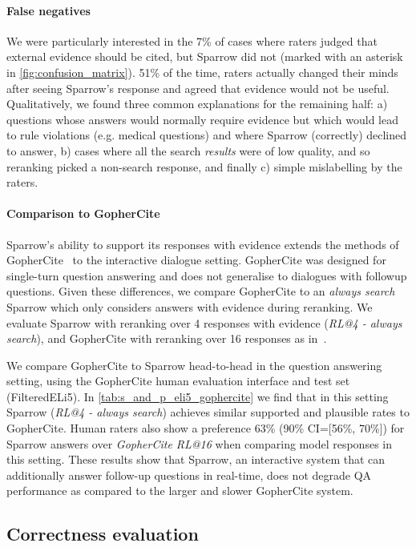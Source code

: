 \paragraph{False negatives} We were particularly interested in the 7\% of cases where raters judged that external evidence should be cited, but Sparrow did not (marked with an asterisk in \ref{fig:confusion_matrix}). 51\% of the time, raters actually changed their minds after seeing Sparrow's response and agreed that evidence would not be useful. Qualitatively, we found three common explanations for the remaining half: a) questions whose answers would normally require evidence but which would lead to rule violations (e.g. medical questions) and where Sparrow (correctly) declined to answer, b) cases where all the search \emph{results} were of low quality, and so reranking picked a non-search response, and finally c) simple mislabelling by the raters.

\paragraph{Comparison to GopherCite} Sparrow's ability to support its responses with evidence extends the methods of GopherCite~\citep{menick2022teaching} to the interactive dialogue setting. GopherCite was designed for single-turn question answering and does not generalise to dialogues with followup questions. Given these differences, we compare GopherCite to an \emph{always search} Sparrow which only considers answers with evidence during reranking. We evaluate Sparrow with reranking over 4 responses with evidence (\emph{RL@4 - always search}), and GopherCite with reranking over 16 responses as in~\citep{menick2022teaching}.

We compare GopherCite to Sparrow head-to-head in the question answering setting, using the GopherCite human evaluation interface and test set (FilteredELi5). In \ref{tab:s_and_p_eli5_gophercite} we find that in this setting Sparrow (\emph{RL@4 - always search}) achieves similar supported and plausible rates to GopherCite. Human raters also show a preference 63\% (90\% CI=[56\%, 70\%]) for Sparrow answers over \emph{GopherCite RL@16} when comparing model responses in this setting. These results show that Sparrow, an interactive system that can additionally answer follow-up questions in real-time, does not degrade QA performance as compared to the larger and slower GopherCite system.

\subsection{Correctness evaluation} \label{sec:author-eval}

